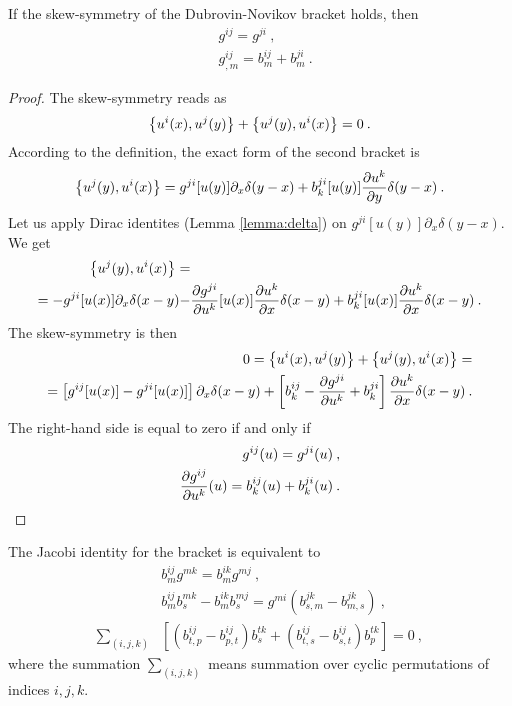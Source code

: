 \begin{lemma} \label{lemma:skew-symmetry}
    If the skew-symmetry of the Dubrovin-Novikov bracket holds, then
    \begin{align}
        &g^{ij} = g^{ji} \:, \label{eq:skew-1}\\
        &g^{ij}_{,m} = b^{ij}_m + b^{ji}_m \label{eq:skew-2} \:.
    \end{align}
\end{lemma}
\begin{proof}
    The skew-symmetry reads as
    \begin{align}
        \left \lbrace u^i(x),u^j(y) \right \rbrace + \left \lbrace u^j(y),u^i(x) \right \rbrace = 0 \:.
    \end{align}
    According to the definition, the exact form of the second bracket is
    \begin{align}
        \left \lbrace u^j(y),u^i(x) \right \rbrace =  g^{ji}[u(y)] \partial_x \delta(y-x) + b^{ji}_k[u(y)] \frac{\partial u^k}{\partial y} \delta(y-x) \:.
    \end{align}
    Let us apply Dirac identites (Lemma \vref{lemma:delta}) on $g^{ji}[u(y)]\partial_x \delta(y-x)$. We get
    \begin{align}
        \left \lbrace u^j(y),u^i(x) \right \rbrace =& \nonumber \\ 
        = - g^{ji} [u(x)] \partial_x \delta(x-y) -& \frac{\partial g^{ji}}{\partial u^k}[u(x)] \frac{\partial u^k}{\partial x} \delta(x-y) + b^{ji}_k[u(x)] \frac{\partial u^k}{\partial x} \delta(x-y)
        \:.
    \end{align}
    The skew-symmetry is then
    \begin{align}
        0 = \left \lbrace u^i(x),u^j(y) \right \rbrace + \left \lbrace u^j(y),u^i(x) \right \rbrace = \nonumber
        \\= \left[ g^{ij}[u(x)]  - g^{ji}[u(x)] \right] \partial_x \delta(x-y) + \left[ b^{ij}_k - \frac{\partial g^{ji}}{\partial u^k}  + b^{ji}_k  \right] \frac{\partial u^k}{\partial x} \delta(x-y) \:.
    \end{align}
    The right-hand side is equal to zero if and only if
    \begin{align}
        g^{ij}(u) = g^{ji}(u) \:, \label{eq:Th.Novikov-symetrie} \\
        \frac{\partial g^{ij}}{\partial u^k}(u) = b^{ij}_k(u) + b^{ji}_k(u)  \:. \label{eq:Th.Novikov-konexe}
    \end{align}
\end{proof}

\begin{lemma} \label{lemma:Jacobi}
    The Jacobi identity for the bracket is equivalent to 
    \begin{align}
        &b^{ij}_m g^{mk} = b^{ik}_m g^{mj} \:, \label{eq:Jacobi-1}\\ 
        &b^{ij}_{m} b^{mk}_s - b^{ik}_m b^{mj}_s = g^{mi} \left( b^{jk}_{s,m} - b^{jk}_{m,s} \right) \:, \label{eq:Jacobi-2}\\
        \sum_{(i,j,k)}& \left[ (b^{ij}_{t,p} - b^{ij}_{p,t}) b^{tk}_s + (b^{ij}_{t,s} - b^{ij}_{s,t}) b^{tk}_p \right] = 0 \:, \label{eq:Jacobi-3}
    \end{align}
    where the summation $\sum_{(i,j,k)}$ means summation over cyclic permutations of indices $i,j,k$.
\end{lemma}

